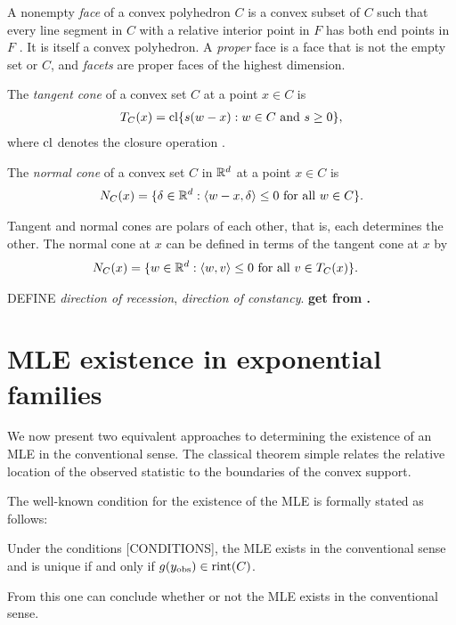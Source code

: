 A nonempty \emph{face} of a convex polyhedron $C$ is a convex subset of $C$ such that 
every line segment in $C$ with a relative interior point in $F$ has both end points in 
$F$ \citep{Rockafellar:1970}.  It is itself a convex polyhedron.
A \emph{proper} face is a face that is not the empty set or $C$, and 
\emph{facets} are proper faces of the highest dimension.

The \emph{tangent cone} of a convex set $C$ at a point $x \in C$ is
\begin{align*}
	T_C(x) = \operatorname{cl}\{s(w-x):w \in C \text{ and } s \geq 0 \},
\end{align*}
where $\operatorname{cl}$ denotes the closure operation \citep[Theorem 6.9]{Rockafellar}.  

The \emph{normal cone} of a convex set $C$ in ${\mathbb R}^d$ at a point $x \in C$ is 
\begin{align*}
	N_C(x) = \{ \delta \in {\mathbb R}^d: \langle w-x,\delta \rangle \leq 0 \text{ for all } w \in C 
\}.
\end{align*}

Tangent and normal cones are polars of each other, that is, each determines the other.  
The normal cone at $x$ can be defined in terms of the tangent cone at $x$ by
\begin{align*}
	N_C(x) 	&= \{ w \in {\mathbb R}^d: \langle  w, v  \rangle \leq 0 \text{ for all } v \in T_C(x) \}.
\end{align*}

DEFINE \emph{direction of recession}, \emph{direction of constancy}.  \textbf{get from 
\citep{Rockafellar:1970}.}



\section{MLE existence in exponential families}
We now present two equivalent approaches to determining the existence of an MLE
in the conventional sense.  The classical theorem simple relates the relative location
of the observed statistic to the boundaries of the convex support.  

The well-known condition for the existence of the MLE \citep{Barndorff, Brown:1986} is 
formally stated as follows:
\begin{theorem} \label{Thm:MLE rint}
Under the conditions [CONDITIONS], the MLE exists in the conventional sense and is 
unique if and only if 
$g(y_{\textrm{obs}}) \in \operatorname{rint}(C)$.
\end{theorem}

From this one can conclude whether or not the MLE exists in the conventional sense.

